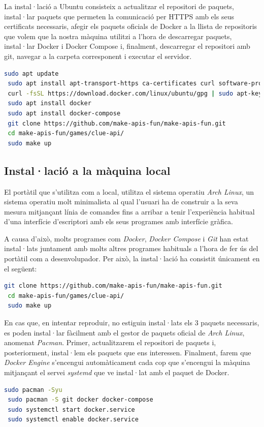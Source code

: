 La instal·lació a Ubuntu consisteix a actualitzar el repositori de paquets, instal·lar paquets que permeten la comunicació per HTTPS amb els seus certificats necessaris, afegir els paquets oficials de Docker a la llista de repositoris que volem que la nostra màquina utilitzi a l'hora de descarregar paquets, instal·lar Docker i Docker Compose i, finalment, descarregar el repositori amb git, navegar a la carpeta corresponent i executar el servidor.

\begin{lstlisting}[language=bash, caption=Instruccions per instal·lar el servidor al núvol]
 sudo apt update
 sudo apt install apt-transport-https ca-certificates curl software-properties-common
 curl -fsSL https://download.docker.com/linux/ubuntu/gpg | sudo apt-key add -
 sudo apt install docker
 sudo apt install docker-compose
 git clone https://github.com/make-apis-fun/make-apis-fun.git
 cd make-apis-fun/games/clue-api/
 sudo make up
\end{lstlisting}


\subsection{Instal·lació a la màquina local}

El portàtil que s'utilitza com a local, utilitza el sistema operatiu \textit{Arch Linux}, un sistema operatiu molt minimalista al qual l'usuari ha de construir a la seva mesura mitjançant línia de comandes fins a arribar a tenir l'experiència habitual d'una interfície d'escriptori amb els seus programes amb interfície gràfica.

A causa d'això, molts programes com \textit{Docker}, \textit{Docker Compose} i \textit{Git} han estat instal·lats juntament amb molts altres programes habituals a l'hora de fer ús del portàtil com a desenvolupador. Per això, la instal·lació ha consistit únicament en el següent:

\begin{lstlisting}[language=bash, caption=Instruccions per instal·lar el servidor al local]
 git clone https://github.com/make-apis-fun/make-apis-fun.git
 cd make-apis-fun/games/clue-api/
 sudo make up
\end{lstlisting}

En cas que, en intentar reproduir, no estiguin instal·lats els 3 paquets necessaris, es poden instal·lar fàcilment amb el gestor de paquets oficial de \textit{Arch Linux}, anomenat \textit{Pacman}. Primer, actualitzarem el repositori de paquets i, posteriorment, instal·lem els paquets que ens interessen. Finalment, farem que \textit{Docker Engine} s'encengui automàticament cada cop que s'encengui la màquina mitjançant el servei \textit{systemd} que ve instal·lat amb el paquet de Docker.
\begin{lstlisting}[language=bash, caption=Instruccions per els prerequisits al local]
 sudo pacman -Syu
 sudo pacman -S git docker docker-compose
 sudo systemctl start docker.service
 sudo systemctl enable docker.service
\end{lstlisting}

